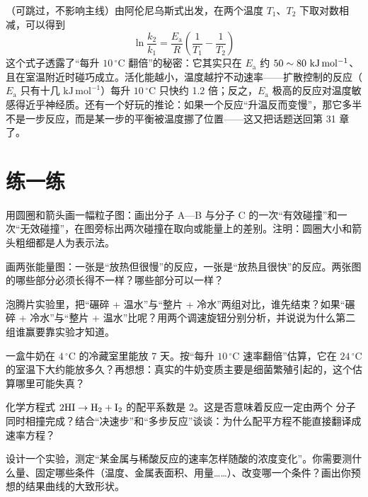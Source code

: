 \begin{tiaozhan}
（可跳过，不影响主线）由阿伦尼乌斯式出发，在两个温度 $T_1$、$T_2$ 下取对数相减，可以得到
\[\ln\frac{k_2}{k_1} = \frac{E_{\mathrm{a}}}{R}\left(\frac{1}{T_1}-\frac{1}{T_2}\right)\]
这个式子透露了“每升 $10\,^{\circ}\mathrm{C}$ 翻倍”的秘密：它其实只在 $E_{\mathrm{a}}$ 约 $50\sim80\ \mathrm{kJ\,mol^{-1}}$、且在室温附近时碰巧成立。活化能越小，温度越拧不动速率——扩散控制的反应（$E_{\mathrm{a}}$ 只有十几 $\mathrm{kJ\,mol^{-1}}$）每升 $10\,^{\circ}\mathrm{C}$ 只快约 1.2 倍；反之，$E_{\mathrm{a}}$ 极高的反应对温度敏感得近乎神经质。还有一个好玩的推论：如果一个反应“升温反而变慢”，那它多半不是一步反应，而是某一步的平衡被温度挪了位置——这又把话题送回第 31 章了。
\end{tiaozhan}

\section*{练一练}

\begin{sikaoti}
\item 用圆圈和箭头画一幅粒子图：画出分子 A—B 与分子 C 的一次“有效碰撞”和一次“无效碰撞”，在图旁标出两次碰撞在取向或能量上的差别。注明：圆圈大小和箭头粗细都是人为表示法。
\item 画两张能量图：一张是“放热但很慢”的反应，一张是“放热且很快”的反应。两张图的哪些部分必须长得不一样？哪些部分可以一样？
\item 泡腾片实验里，把“碾碎 + 温水”与“整片 + 冷水”两组对比，谁先结束？如果“碾碎 + 冷水”与“整片 + 温水”比呢？用两个调速旋钮分别分析，并说说为什么第二组谁赢要靠实验才知道。
\item 一盒牛奶在 $4\,^{\circ}\mathrm{C}$ 的冷藏室里能放 7 天。按“每升 $10\,^{\circ}\mathrm{C}$ 速率翻倍”估算，它在 $24\,^{\circ}\mathrm{C}$ 的室温下大约能放多久？再想想：真实的牛奶变质主要是细菌繁殖引起的，这个估算哪里可能失真？
\item 化学方程式 $\mathrm{2HI} \rightarrow \mathrm{H_2} + \mathrm{I_2}$ 的配平系数是 2。这是否意味着反应一定由两个  分子同时相撞完成？结合“决速步”和“多步反应”谈谈：为什么配平方程不能直接翻译成速率方程？
\item 设计一个实验，测定“某金属与稀酸反应的速率怎样随酸的浓度变化”。你需要测什么量、固定哪些条件（温度、金属表面积、用量……）、改变哪一个条件？画出你预想的结果曲线的大致形状。
\end{sikaoti}
